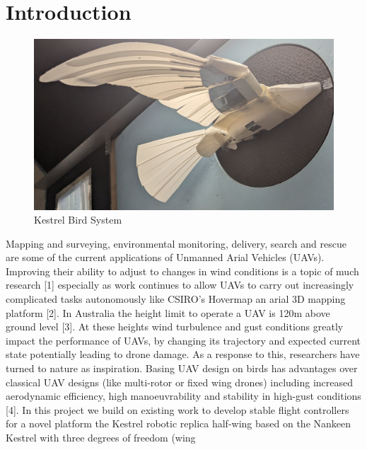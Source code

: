 \section{Introduction}


    \setlength{\intextsep}{0pt}
    \begin{figure}
        \includegraphics[width=\textwidth/2]{./Resources/Kestrel.jpg}
        \caption{\label{fig:figure 1} Kestrel Bird System}
    \end{figure}
    Mapping and surveying, environmental monitoring, delivery, search and
    rescue are some of the current applications of Unmanned Arial Vehicles
    (UAVs). Improving their ability to adjust to changes in wind conditions
    is a topic of much research [1] especially as work continues to
    allow UAVs to carry out increasingly complicated tasks autonomously
    like CSIRO’s Hovermap an arial 3D mapping platform [2].
    \vspace{\baselineskip}
    In Australia the height limit to operate a UAV is 120m above ground
    level [3]. At these heights wind turbulence and gust conditions greatly
    impact the performance of UAVs, by changing its trajectory and expected
    current state potentially leading to drone damage. As a response to
    this, researchers have turned to nature as inspiration. Basing UAV
    design on birds has advantages over classical UAV designs (like
    multi-rotor or fixed wing drones) including increased aerodynamic
    efficiency, high manoeuvrability and stability in high-gust conditions
    [4].
    \vspace{\baselineskip}
    In this project we build on existing work to develop stable flight
    controllers for a novel platform the Kestrel robotic replica half-wing
    based on the Nankeen Kestrel with three degrees of freedom (wing
